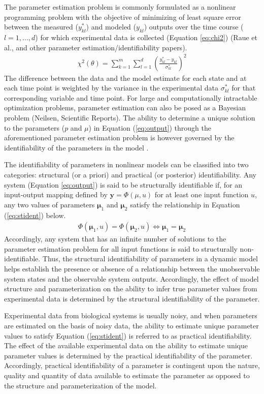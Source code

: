 \documentclass[10pt]{article}
\begin{document}
	The parameter estimation problem is commonly formulated as a nonlinear programming problem with the objective of minimizing of least square error between the measured ($y_{kl}^*$) and modeled ($y_{kl}$) outputs over the time course ($l = {1, ..., d}$) for which experimental data is collected (Equation \ref{eq:chi2}) (Raue et al., and other parameter estimation/identifiability papers).  
	\begin{align}\label{eq:chi2}
	\chi^2(\theta) = \sum_{k=1}^{m}\sum_{l=1}^{d}\left(\frac{y_{kl}^*-y_{kl}}{\sigma_{kl}^*}\right)^2
	\end{align}
	The difference between the data and the model estimate for each state and at each time point is weighted by the variance in the experimental data $\sigma_{kl}^*$ for that corresponding variable and time point. For large and computationally intractable optimization problems, parameter estimation can also be posed as a Bayesian problem (Neilsen, Scientific Reports). 	
	The ability to determine a unique solution to the parameters ($p$ and $\mu$) in Equation (\ref{eq:output}) through the aforementioned parameter estimation problem is however governed by the identifiability of the parameters in the model \parencite{McLean2012}. 
	
	The identifiability of parameters in nonlinear models can be classified into two categories: structural (or a priori) and practical (or posterior) identifiability. 	
	Any system (Equation \ref{eq:output}) is said to be structurally identifiable if, for an input-output mapping defined by $\mathbf{y} = \Phi(\mu,u)$ for at least one input function $u$, any two values of parameters $\mathbf{\mu}_1$ and $\mathbf{\mu}_2$ satisfy the relationship in Equation (\ref{eq:stident}) below.
	\begin{align}\label{eq:stident}
	\Phi(\mathbf{\mu}_1,u) = \Phi(\mathbf{\mu}_2,u) \iff \mathbf{\mu}_1 = \mathbf{\mu}_2
	\end{align}
	Accordingly, any system that has an infinite number of solutions to the parameter estimation problem for all input functions is said to structurally non-identifiable. Thus, the structural identifiability of parameters in a dynamic model helps establish the presence or absence of a relationship between the unobservable system states and the observable system outputs. Accordingly, the effect of model structure and parameterization on the ability to infer true parameter values from experimental data is determined by the structural identifiability of the parameter. 
	
	Experimental data from biological systems is usually noisy, and when parameters are estimated on the basis of noisy data, the ability to estimate unique parameter values to satisfy Equation (\ref{eq:stident}) is referred to as practical identifiability. The effect of the available experimental data on the ability to estimate unique parameter values is determined by the practical identifiability of the parameter. Accordingly, practical identifiability of a parameter is contingent upon the nature, quality and quantity of data available to estimate the parameter as opposed to the structure and parameterization of the model. 
	
\end{document}
